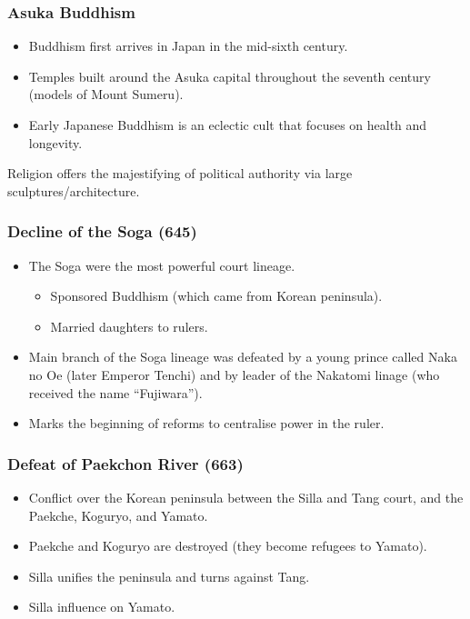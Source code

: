 \documentclass[class=article, crop=false]{standalone}
\begin{document}
  \subsubsection{Asuka Buddhism}
  \begin{itemize}
    \item Buddhism first arrives in Japan in the mid-sixth century.
    \item Temples built around the Asuka capital throughout the seventh century (models of Mount Sumeru).
    \item Early Japanese Buddhism is an eclectic cult that focuses on health and longevity.
  \end{itemize}
  Religion offers the majestifying of political authority via large sculptures/architecture.
  \subsubsection{Decline of the Soga (645)}
  \begin{itemize}
    \item The Soga were the most powerful court lineage.
    \begin{itemize}
      \item Sponsored Buddhism (which came from Korean peninsula).
      \item Married daughters to rulers.
    \end{itemize}
    \item Main branch of the Soga lineage was defeated by a young prince called Naka no Oe (later Emperor Tenchi) and by leader of the Nakatomi linage (who received the name ``Fujiwara'').
    \item Marks the beginning of reforms to centralise power in the ruler.
  \end{itemize}
  \subsubsection{Defeat of Paekchon River (663)}
  \begin{itemize}
    \item Conflict over the Korean peninsula between the Silla and Tang court, and the Paekche, Koguryo, and Yamato.
    \item Paekche and Koguryo are destroyed (they become refugees to Yamato).
    \item Silla unifies the peninsula and turns against Tang.
    \item Silla influence on Yamato.
  \end{itemize}
\end{document}
